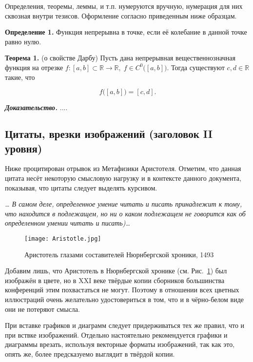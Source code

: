 \documentclass{math-mech-sci}
\begin{document}
Определения, теоремы, леммы, и т.п. нумеруются вручную, нумерация для них сквозная внутри тезисов. Оформление согласно приведенным ниже образцам.

\textbf{Определение 1.} Функция непрерывна в точке, если её колебание в данной точке равно нулю.

\textbf{Теорема 1.} (о свойстве Дарбу) Пусть дана непрерывная вещественнозначная функция на отрезке 
$f:[a,b]\subset \mathbb {R} \to \mathbb {R} ,\;f\in C^{0}{\bigl (}[a,b]{\bigr )}$. Тогда существуют
$ c,d\in \mathbb {R}$ такие, что

\begin{equation*}
	f{\bigl (}[a,b]{\bigr )}=[c,d].
\end{equation*}

\emph{\textbf{Доказательство.}} ....
	
	
\subsection*{Цитаты, врезки изображений (заголовок II уровня)}

Ниже процитирован отрывок из Метафизики Аристотеля. Отметим, что
данная цитата несёт некоторую смысловую нагрузку и в контексте данного
документа, показывая, что цитаты следует выделять курсивом.

\emph{\ldots{} В самом деле, определенное умение читать и писать
  принадлежит к тому, что находится в подлежащем, но ни о каком
  подлежащем не говорится как об определенном умении читать и
  писать)\ldots}

\begin{figure}[h]
\begin{center}
\texttt{[image: Aristotle.jpg]}
\end{center}
\caption{Аристотель глазами составителей Нюрнбергской хроники,
  1493}\label{fig:aristotle}
\end{figure}

Добавим лишь, что Аристотель в Нюрнбергской хронике
(см. Рис.~\ref{fig:aristotle}) был изображён в цвете, но в XXI веке
твёрдые копии сборников большинства конференций этим похвастаться не
могут. Поэтому в отношении всех цветных иллюстраций очень желательно
удостовериться в том, что и в чёрно-белом виде они не потеряют смысла.

При вставке графиков и диаграмм следует придерживаться тех же правил,
что и при вствке изображений. Отдельно настоятельно рекомендуется
графики и диаграммы врезать, используя векторные форматы изображений,
так как это, опять же, более предсказуемо выглядит в твёрдой копии.
\end{document}
